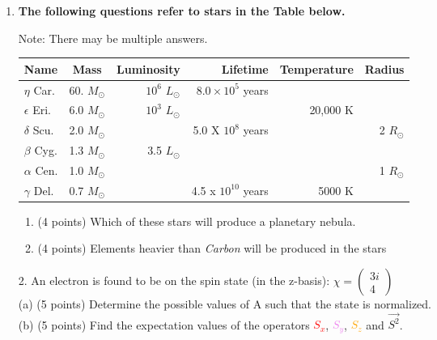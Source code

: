 \documentclass[12pt]{article}
\begin{document}
\begin{enumerate}
    \item \textbf{The following questions refer to stars in the Table below.}

Note: There may be multiple answers.

\begin{center}
\begin{tabular}{|l|c|r|r|r|r|}\hline\hline
Name & Mass & Luminosity  & Lifetime & Temperature & Radius \\\hline\hline $\eta$ Car.   & 60. \(M_\odot\) & $10^{6}$ \(L_\odot\) & $8.0 \times 10^{5}$ years & &  \\\hline
$\epsilon$ Eri.   & 6.0 \(M_\odot\) & $10^{3}$ \(L_\odot\) &      & 20,000 K &   \\\hline
$\delta$ Scu.   & 2.0 \(M_\odot\) &         & 5.0 X $10^{8}$ years & & 2 \(R_\odot\) \\\hline
$\beta$ Cyg.   & 1.3 \(M_\odot\) & 3.5 \(L_\odot\)   & & &   \\\hline
$\alpha$ Cen.   & 1.0 \(M_\odot\) &         & & & 1 \(R_\odot\) \\\hline
$\gamma$ Del.   & 0.7 \(M_\odot\) & & 4.5 x $10^{10}$ years & 5000 K &  \\\hline
\end{tabular}\vskip 0.2in
\end{center} 
\begin{enumerate}
    \item (4 points) Which of these stars will produce a planetary nebula.\\

\item (4 points) Elements heavier than \textit{Carbon} will be produced in the stars
\end{enumerate}

2. An electron is found to be on the spin state (in the z-basis): $\chi =   \begin{pmatrix}
    3i\\
    4
    \end{pmatrix}$\\ 
    

(a) (5 points) Determine the possible values of A such that the state is normalized.\\

(b) (5 points) Find the expectation values of the operators \textcolor{red}{$S_x$}, \textcolor{violet}{$S_y$}, \textcolor{orange}{$S_z$} and $\vec{S^2}$.\\



\end{enumerate}
\end{document}
